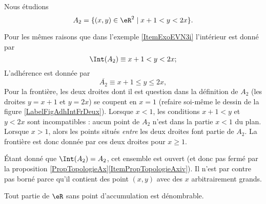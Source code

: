 \begin{example}\label{ItemExoEVN3ii}
	Nous étudions
	\begin{equation}
		A_2 = \{ (x, y ) \in \eR^2 \; | \; x+ 1 < y < 2x \}.
	\end{equation}

	Pour les mêmes raisons que dans l'exemple \ref{ItemExoEVN3i} l'intérieur est donné par
	\begin{equation}
		\Int(A_2)\equiv x+1<y<2x;
	\end{equation}
	L'adhérence est donnée par
	\begin{equation}
		\overline{ A_2 }\equiv x+1\leq y\leq 2x,
	\end{equation}
	Pour la frontière, les deux droites dont il est question dans la définition de \( A_2\) (les droites \( y=x+1\) et \( y=2x\)) se coupent en \( x=1\) (refaire soi-même le dessin de la figure \ref{LabelFigAdhIntFrDeux}). Lorsque \( x<1\), les conditions \( x+1<y\) et \( y<2x\) sont incompatibles : aucun point de \( A_2\) n'est dans la partie \( x<1\) du plan. Lorsque \( x>1\), alors les points situés \emph{entre} les deux droites font partie de \( A_2\). La frontière est donc donnée par ces deux droites pour \( x\geq 1\).

	Étant donné que \( \Int(A_2)=A_2\), cet ensemble est ouvert (et donc pas fermé par la proposition \ref{PropTopologieAx}\ref{ItemPropTopologieAxiv}). Il n'est par contre pas borné parce qu'il contient des point \( (x,y)\) avec des \( x\) arbitrairement grands.
\end{example}

\newcommand{\CaptionFigAdhIntFrDeux}{Notez que le point d'angle fait partie de la frontière, mais pas de l'ensemble. Exemple \ref{ItemExoEVN3ii}.}



\begin{proposition}
	Tout partie de \( \eR\) sans point d'accumulation est dénombrable.
\end{proposition}

